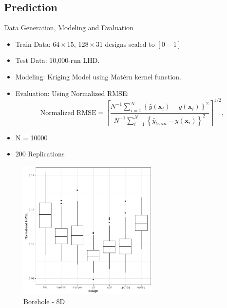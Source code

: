 \documentclass{beamer}
\newcommand{\x}{\boldsymbol{x}}
\begin{document}
\subsection{Prediction}
\begin{frame}{Data Generation, Modeling and Evaluation}
\begin{itemize}
  \item Train Data: $64\times 15$, $128\times31$ designs scaled to $[0-1]$
  \item  Test Data: 10,000-run LHD.
  \item Modeling: Kriging Model using Mat\'ern kernel function.
  \item Evaluation: Using Normalized RMSE:
  $$
\text {Normalized RMSE}=\left[\frac{N^{-1} \sum_{i=1}^N\left\{\hat{y}\left(\x_i\right)-y\left(\x_i\right)\right\}^2}{N^{-1} \sum_{i=1}^N\left\{\bar{y}_{train}-y\left(\x_i\right)\right\}^2}\right]^{1 / 2},
$$
\item N = 10000
\item 200 Replications
\end{itemize}
\end{frame}


\begin{frame}
 \begin{figure}
 \centering
 \caption{Borehole - 8D}
 \includegraphics[height=7cm]{../chapters/EGO/pdfs/Borehole_64x15}
 \end{figure}
\end{frame}


\end{document}
